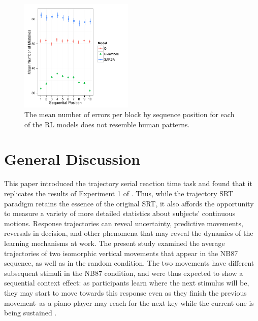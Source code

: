 \documentclass[man,floatsintext]{apa6}
\begin{document}
\vspace{-.2cm}
\begin{figure}[ht]
  \centering
  \includegraphics[width=0.48\textwidth]{figures/RL500_ModelMistakes_by_seqpos}
  \caption{The mean number of errors per block by sequence position for each of the RL models does not resemble human patterns.}
  \label{fig:model-mistakes}
 \end{figure} 


\section{General Discussion}


This paper introduced the trajectory serial reaction time task and found that it replicates the results of Experiment 1 of  . Thus, while the trajectory SRT paradigm retains the essence of the original SRT, it also affords the opportunity to measure a variety of more detailed statistics about subjects' continuous motions. Response trajectories can reveal uncertainty, predictive movements, reversals in decision, and other phenomena that may reveal the dynamics of the learning mechanisms at work. The present study examined the average trajectories of two isomorphic vertical movements that appear in the NB87 sequence, as well as in the random condition. The two movements have different subsequent stimuli in the NB87 condition, and were thus expected to show a sequential context effect: as participants learn where the next stimulus will be, they may start to move towards this response even as they finish the previous movement--as a piano player may reach for the next key while the current one is being sustained \cite{Soechting:1996}.
\end{document}
